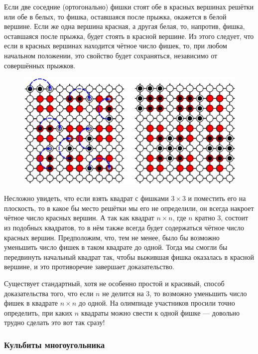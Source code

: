 Если две соседние (ортогонально) фишки стоят обе в красных вершинах решётки или обе в белых, то фишка, оставшаяся после прыжка, окажется в белой вершине.
Если же одна вершина красная, а другая белая, то, напротив, фишка, оставшаяся после прыжка, будет стоять в красной вершине.
Из этого следует, что если в красных вершинах находится чётное число фишек, то, при любом начальном положении, это свойство будет сохраняться, независимо от совершённых прыжков.

\begin{figure}[h!]
\centering
\includegraphics[scale=0.5]{Figs/Algorithms/square}
\end{figure}

Несложно увидеть, что если взять квадрат с фишками $3\times 3$ и поместить его на плоскость, то в какое бы место решётки мы его не определили, он всегда накроет чётное число красных вершин.
А так как квадрат $n\times n$, где $n$ кратно $3$, состоит из подобных квадратов, то в нём также всегда будет содержаться чётное число красных вершин.
Предположим, что, тем не менее, было бы возможно уменьшить число фишек в таком квадрате до одной.
Тогда мы смогли бы передвинуть начальный квадрат так, чтобы выжившая фишка оказалась в красной вершине, и это противоречие завершает доказательство.
\heart

Существует стандартный, хотя не особенно простой и красивый, %
способ доказательства того, что если $n$ не делится на $3$, то возможно уменьшить число фишек в квадрате $n\times n$ до одной.
На олимпиаде участников просили точно определить, при каких $n$ квадраты можно свести к одной фишке --- довольно трудно сделать это вот так сразу!

\subsubsection*{Кульбиты многоугольника}%

